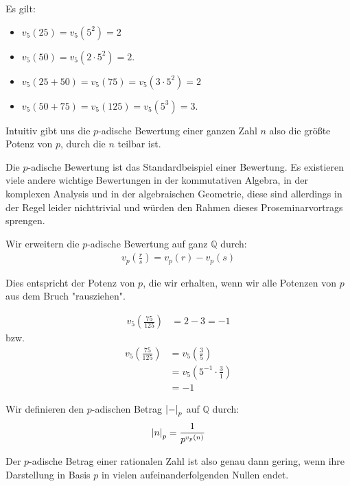 \documentclass{report}
\newcommand*{\newpar}{\par\vspace{\baselineskip}\noindent}
\newcommand{\bQ}{\mathbb{Q}}
\begin{document}
	\begin{example}
		Es gilt:
		\begin{itemize}
			\item $v_5(25) = v_5(5^2) = 2$
			\item $v_5(50) = v_5(2 \cdot 5^2) = 2$.
			\item $v_5(25 + 50) = v_5(75) = v_5(3 \cdot 5^2) = 2$
			\item $v_5(50 + 75) = v_5(125) = v_5(5^3) = 3$.
		\end{itemize} 
	\end{example}
	Intuitiv gibt uns die $p$-adische Bewertung einer ganzen Zahl $n$ also die größte Potenz von $p$, durch die $n$ teilbar ist.
	\newpar
	Die $p$-adische Bewertung ist das Standardbeispiel einer Bewertung. Es existieren viele andere wichtige Bewertungen in der kommutativen Algebra, in der komplexen Analysis und in der algebraischen Geometrie, diese sind allerdings in der Regel leider nichttrivial und würden den Rahmen dieses Proseminarvortrags sprengen.\\
	\begin{definition}
		Wir erweitern die $p$-adische Bewertung auf ganz $\bQ$ durch:
		\begin{align*}
			v_p\left(\frac{r}{s}\right) = v_p(r) - v_p(s)
		\end{align*}
	\end{definition}
	\noindent Dies entspricht der Potenz von $p$, die wir erhalten, wenn wir alle Potenzen von $p$ aus dem Bruch "rausziehen".
	\begin{example}
		\begin{align*}
			v_5\left(\frac{75}{125}\right) &= 2 - 3 = -1
		\end{align*}
		bzw.
		\begin{align*}
			v_5\left(\frac{75}{125}\right) &= v_5\left(\frac{3}{5}\right)\\ &= v_5\left(5^{-1} \cdot \frac{3}{1}\right)\\
			&= -1
		\end{align*}
	\end{example}
	\begin{definition}
		Wir definieren den $p$-adischen Betrag $\abs{-}_p$ auf $\bQ$ durch:
		\begin{align*} 
			\abs{n}_p = \frac{1}{p^{v_p(n)}}
		\end{align*}
	\end{definition}
	\noindent Der $p$-adische Betrag einer rationalen Zahl ist also genau dann gering, wenn ihre Darstellung in Basis $p$ in vielen aufeinanderfolgenden Nullen endet.
\end{document}
